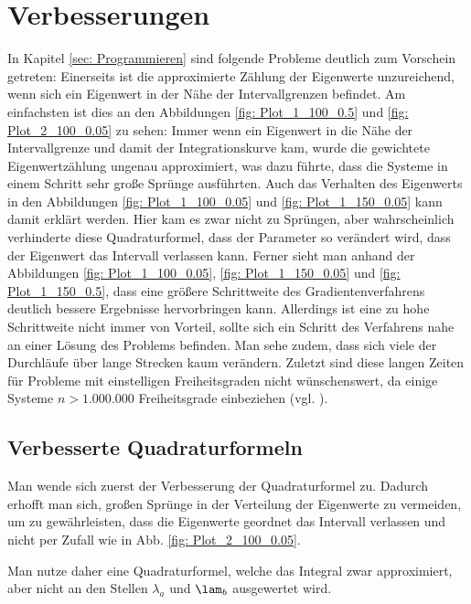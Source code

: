 \documentclass[a4paper,12pt]{report}
\newcommand{\1}{\mathds{1}}
\theoremstyle{plain} %
\theoremstyle{definition} %
\theoremstyle{remark}
\begin{document}
\chapter{Verbesserungen}
\label{sec: Verbesserungen}
      In Kapitel \ref{sec: Programmieren} sind folgende Probleme deutlich zum Vorschein getreten:
      Einerseits ist die approximierte Zählung der Eigenwerte unzureichend, wenn sich ein Eigenwert in der Nähe der Intervallgrenzen befindet.
      Am einfachsten ist dies an den Abbildungen \ref{fig: Plot_1_100_0.5} und \ref{fig: Plot_2_100_0.05} zu sehen:
      Immer wenn ein Eigenwert in die Nähe der Intervallgrenze und damit der Integrationskurve kam, wurde die gewichtete Eigenwertzählung ungenau approximiert, was dazu führte, dass die Systeme in einem Schritt sehr große Sprünge ausführten.
      Auch das Verhalten des Eigenwerts in den Abbildungen \ref{fig: Plot_1_100_0.05} und \ref{fig: Plot_1_150_0.05} kann damit erklärt werden. Hier kam es zwar nicht zu Sprüngen, aber wahrscheinlich verhinderte diese Quadraturformel, dass der Parameter so verändert wird, dass der Eigenwert das Intervall verlassen kann.
      Ferner sieht man anhand der Abbildungen \ref{fig: Plot_1_100_0.05}, \ref{fig: Plot_1_150_0.05} und \ref{fig: Plot_1_150_0.5}, dass eine größere Schrittweite des Gradientenverfahrens deutlich bessere Ergebnisse hervorbringen kann.
      Allerdings ist eine zu hohe Schrittweite nicht immer von Vorteil, sollte sich ein Schritt des Verfahrens nahe an einer Lösung des Problems befinden.
      Man sehe zudem, dass sich viele der Durchläufe über lange Strecken kaum verändern.
      Zuletzt sind diese langen Zeiten für Probleme mit einstelligen Freiheitsgraden nicht wünschenswert, da einige Systeme $n>1.000.000$ Freiheitsgrade einbeziehen (vgl. \cite[S. 359]{maschinendynamikDresig}).

      \section{Verbesserte Quadraturformeln}
            Man wende sich zuerst der Verbesserung der Quadraturformel zu.
            Dadurch erhofft man sich, großen Sprünge in der Verteilung der Eigenwerte zu vermeiden, um zu gewährleisten, dass die Eigenwerte geordnet das Intervall verlassen und nicht per Zufall wie in Abb. \ref{fig: Plot_2_100_0.05}.

            Man nutze daher eine Quadraturformel, welche das Integral zwar approximiert, aber nicht an den Stellen $\lambda_a$ und $\lam_b$ ausgewertet wird.
\end{document}
